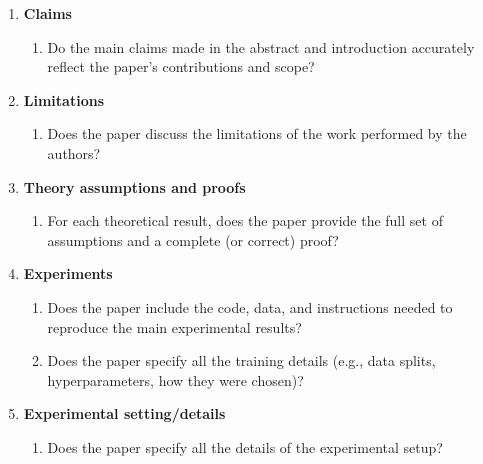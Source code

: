 \documentclass{article}
\begin{document}
\begin{enumerate}

\item {\bf Claims}
    \begin{enumerate}
        \item Do the main claims made in the abstract and introduction accurately reflect the paper's contributions and scope?
    \end{enumerate}

\item {\bf Limitations}
    \begin{enumerate}
        \item Does the paper discuss the limitations of the work performed by the authors?
    \end{enumerate}

\item {\bf Theory assumptions and proofs}
    \begin{enumerate}
        \item For each theoretical result, does the paper provide the full set of assumptions and a complete (or correct) proof?
    \end{enumerate}

\item {\bf Experiments}
    \begin{enumerate}
        \item Does the paper include the code, data, and instructions needed to reproduce the main experimental results?
        \item Does the paper specify all the training details (e.g., data splits, hyperparameters, how they were chosen)?
    \end{enumerate}

\item {\bf Experimental setting/details}
    \begin{enumerate}
        \item Does the paper specify all the details of the experimental setup?
    \end{enumerate}


\end{enumerate}
\end{document}
